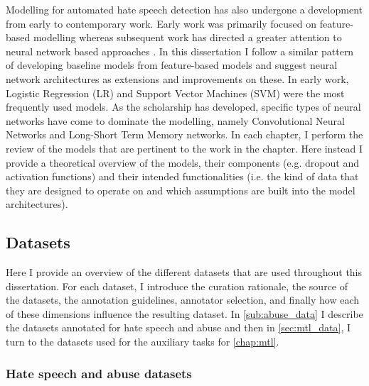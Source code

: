 Modelling for automated hate speech detection has also undergone a development from early to contemporary work. Early work was primarily focused on feature-based modelling \citep[e.g.][]{Waseem-Hovy:2016,Waseem:2016,Davidson:2017,Sahlgren:2018} whereas subsequent work has directed a greater attention to neural network based approaches \citep[e.g.][]{Kolhatkar:2021,Waseem:2018,Gamback:2017,Badjatiya:2017}. In this dissertation I follow a similar pattern of developing baseline models from feature-based models and suggest neural network architectures as extensions and improvements on these. In early work, Logistic Regression (LR) and Support Vector Machines (SVM) were the most frequently used models. As the scholarship has developed, specific types of neural networks have come to dominate the modelling, namely Convolutional Neural Networks and Long-Short Term Memory networks. In each chapter, I perform the review of the models that are pertinent to the work in the chapter. Here instead I provide a theoretical overview of the models, their components (e.g. dropout and activation functions) and their intended functionalities (i.e. the kind of data that they are designed to operate on and which assumptions are built into the model architectures).

\subsection{Datasets}\label{sec:datasets}

Here I provide an overview of the different datasets that are used throughout this dissertation. For each dataset, I introduce the curation rationale, the source of the datasets, the annotation guidelines, annotator selection, and finally how each of these dimensions influence the resulting dataset. In \autoref{sub:abuse_data} I describe the datasets annotated for hate speech and abuse and then in \autoref{sec:mtl_data}, I turn to the datasets used for the auxiliary tasks for \autoref{chap:mtl}.

\subsubsection{Hate speech and abuse datasets}\label{sub:abuse_data}

